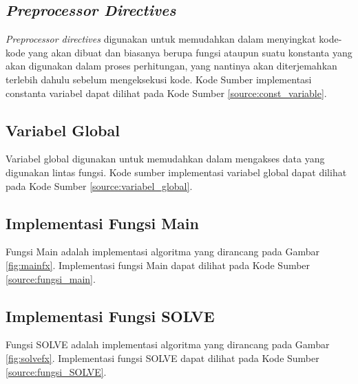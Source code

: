 \subsection{\textit{Preprocessor Directives}}
\textit{Preprocessor directives} digunakan untuk memudahkan dalam menyingkat kode-kode yang akan dibuat dan biasanya berupa fungsi ataupun suatu konstanta yang akan digunakan dalam proses perhitungan, yang nantinya akan diterjemahkan terlebih dahulu sebelum mengeksekusi kode. Kode Sumber implementasi constanta variabel dapat dilihat pada Kode Sumber \ref{source:const_variable}.

\begin{minipage}{\linewidth}

\end{minipage}

\subsection{Variabel Global}
Variabel global digunakan untuk memudahkan dalam mengakses data yang digunakan lintas fungsi. Kode sumber implementasi variabel global dapat dilihat pada Kode Sumber \ref{source:variabel_global}.

\begin{minipage}{\linewidth}

\end{minipage} 

\subsection{Implementasi Fungsi Main}
Fungsi Main adalah implementasi algoritma yang dirancang pada Gambar \ref{fig:mainfx}. Implementasi fungsi Main dapat dilihat pada Kode Sumber \ref{source:fungsi_main}.



\subsection{Implementasi Fungsi SOLVE}
Fungsi SOLVE adalah implementasi algoritma yang dirancang pada Gambar \ref{fig:solvefx}. Implementasi fungsi SOLVE dapat dilihat pada Kode Sumber \ref{source:fungsi_SOLVE}. 

